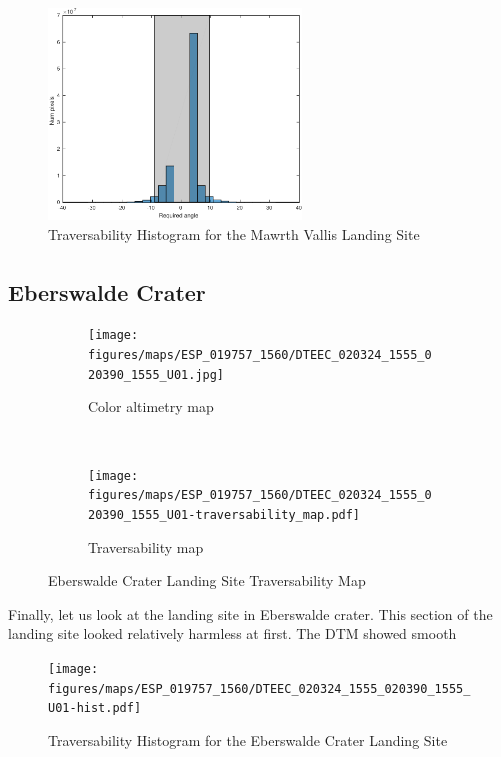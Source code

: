 \documentclass[12pt]{article}
\newcommand{\supcite}[1]{\textsuperscript{\cite{#1}}}
\begin{document}
\begin{figure}[h!]
  \centering
  \includegraphics[width=0.6\textwidth]{figures/maps/ESP_015985_2040/DTEEC_015985_2040_016262_2040_U01-hist.pdf}
  \caption{Traversability Histogram for the Mawrth Vallis Landing Site}
  \label{fig:mawrth_hist}
\end{figure}

\subsection{Eberswalde Crater\supcite{bib:ESP_015985_2040}}
\label{sub:eberswalde_crater}
\begin{figure}[h!]
  \centering
  \begin{subfigure}[t]{0.27\textwidth}
    \centering
    \texttt{[image: figures/maps/ESP\_019757\_1560/DTEEC\_020324\_1555\_020390\_1555\_U01.jpg]}
    \caption{Color altimetry map}
    \label{fig:eberswalde_dtm}
  \end{subfigure}
  ~
  \begin{subfigure}[t]{0.27\textwidth}
    \centering
    \texttt{[image: figures/maps/ESP\_019757\_1560/DTEEC\_020324\_1555\_020390\_1555\_U01-traversability\_map.pdf]}
    \caption{Traversability map}
    \label{fig:eberswalde_traversability}
  \end{subfigure}
  \caption{Eberswalde Crater Landing Site Traversability Map}
  \label{fig:eberswalde}
\end{figure}
\par Finally, let us look at the landing site in Eberswalde crater. This section of the landing site looked relatively harmless at first. The DTM showed smooth
\begin{figure}[h!]
  \centering
  \texttt{[image: figures/maps/ESP\_019757\_1560/DTEEC\_020324\_1555\_020390\_1555\_U01-hist.pdf]}
  \caption{Traversability Histogram for the Eberswalde Crater Landing Site}
  \label{fig:eberswalde_hist}
\end{figure}
\end{document}
